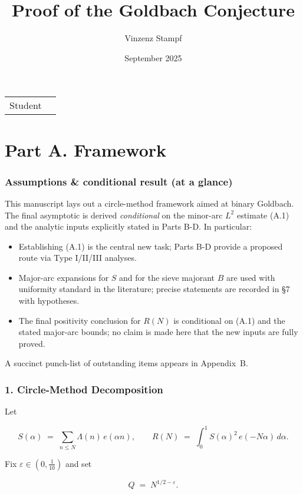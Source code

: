 \documentclass[11pt]{article}
\title{Proof of the Goldbach Conjecture}
\author{Vinzenz Stampf}
\date{September 2025}
\makeatletter
\theoremstyle{definition}
\theoremstyle{remark}
\providecommand{\theauthor}{\@author}
\makeatother
\begin{document}
\maketitle

\noindent\begin{tabular}{@{}ll}
	Student & \theauthor \\
\end{tabular}

\part*{Part A. Framework}

\section*{Assumptions \& conditional result (at a glance)}

This manuscript lays out a circle-method framework aimed at binary Goldbach. The final asymptotic is derived \emph{conditional} on the minor-arc $L^2$ estimate (A.1) and the analytic inputs explicitly stated in Parts B-D. In particular:

\begin{itemize}
	\item Establishing (A.1) is the central new task; Parts B-D provide a proposed route via Type I/II/III analyses.
	\item Major-arc expansions for $S$ and for the sieve majorant $B$ are used with uniformity standard in the literature; precise statements are recorded in §7 with hypotheses.
	\item The final positivity conclusion for $R(N)$ is conditional on (A.1) and the stated major-arc bounds; no claim is made here that the new inputs are fully proved.
\end{itemize}

A succinct punch-list of outstanding items appears in Appendix~B.

\section*{1. Circle-Method Decomposition}

Let

$$
	S(\alpha)\;=\;\sum_{n\le N}\Lambda(n)\,e(\alpha n),\qquad
	R(N)\;=\;\int_{0}^{1} S(\alpha)^2\,e(-N\alpha)\,d\alpha .
$$

Fix $\varepsilon\in (0,\tfrac1{10})$ and set

$$
	Q \;=\; N^{1/2-\varepsilon}.
$$
\end{document}
